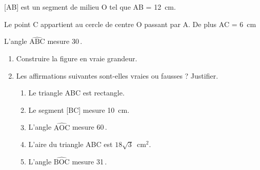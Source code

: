 
\medskip

[AB] est un segment de milieu O tel que AB = 12~cm.

Le point C appartient au cercle de centre O passant par A. De plus AC = 6~cm

L'angle $\widehat{\text{ABC}}$ mesure 30\,\degres.

\medskip

\begin{enumerate}
\item Construire la figure en vraie grandeur.
\item Les affirmations suivantes sont-elles vraies ou fausses ? Justifier.
	\begin{enumerate}
		\item Le triangle ABC est rectangle.
		\item Le segment [BC] mesure 10~cm.
		\item L'angle $\widehat{\text{AOC}}$ mesure 60\,\degres.
		\item L'aire du triangle ABC est $18\sqrt{3}$~cm$^2$.
		\item L'angle $\widehat{\text{BOC}}$ mesure 31\,\degres.
	\end{enumerate}
\end{enumerate}

\vspace{0.5cm}

